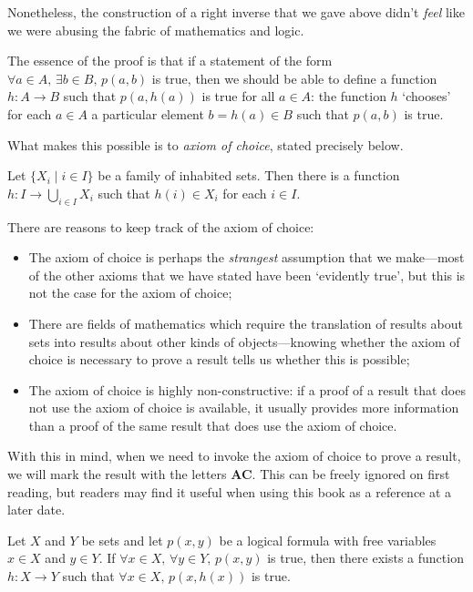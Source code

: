 Nonetheless, the construction of a right inverse that we gave above didn't \textit{feel} like we were abusing the fabric of mathematics and logic.

The essence of the proof is that if a statement of the form $\forall a \in A,\, \exists b \in B,\, p(a,b)$ is true, then we should be able to define a function $h : A \to B$ such that $p(a,h(a))$ is true for all $a \in A$: the function $h$ `chooses' for each $a \in A$ a particular element $b = h(a) \in B$ such that $p(a,b)$ is true.

What makes this possible is to \textit{axiom of choice}, stated precisely below.

\begin{axiom}
\label{axChoice}
Let $\{ X_i \mid i \in I \}$ be a family of inhabited sets. Then there is a function $h : I \to \bigcup\limits_{i \in I} X_i$ such that $h(i) \in X_i$ for each $i \in I$.
\end{axiom}

There are reasons to keep track of the axiom of choice:
\begin{itemize}
\item The axiom of choice is perhaps the \textit{strangest} assumption that we make---most of the other axioms that we have stated have been `evidently true', but this is not the case for the axiom of choice;
\item There are fields of mathematics which require the translation of results about sets into results about other kinds of objects---knowing whether the axiom of choice is necessary to prove a result tells us whether this is possible;
\item The axiom of choice is highly non-constructive: if a proof of a result that does not use the axiom of choice is available, it usually provides more information than a proof of the same result that does use the axiom of choice.
\end{itemize}

With this in mind, when we need to invoke the axiom of choice to prove a result, we will mark the result with the letters {\small \textbf{AC}}. This can be freely ignored on first reading, but readers may find it useful when using this book as a reference at a later date.

\begin{propositionac}
\label{propUsingAC}
Let $X$ and $Y$ be sets and let $p(x,y)$ be a logical formula with free variables $x \in X$ and $y \in Y$. If $\forall x \in X,\, \forall y \in Y,\, p(x,y)$ is true, then there exists a function $h : X \to Y$ such that $\forall x \in X,\, p(x,h(x))$ is true.
\end{propositionac}

